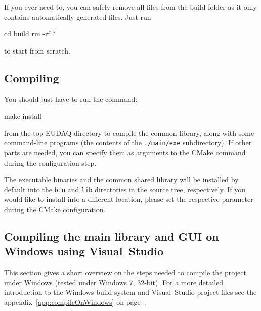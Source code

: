 If you ever need to, you can safely remove all files from the build folder
as it only contains automatically generated files. Just run
\begin{listing}[mybash]
cd build
rm -rf *
\end{listing}
to start from scratch.


\subsection{Compiling}
You should just have to run the command:
\begin{listing}[mybash]
make install
\end{listing}

from the top EUDAQ directory to compile the common library,
along with some command-line programs (the contents of the \texttt{./main/exe} subdirectory).
If other parts are needed, you can specify them as arguments to the
CMake command during the configuration step.

The executable binaries and the common shared library will be installed by default into the
\texttt{bin} and \texttt{lib} directories in the source tree,
respectively. If you would like to install into a different location,
please set the respective parameter during the CMake configuration.

\subsection{Compiling the main library and GUI on Windows using Visual~Studio}

This section gives a short overview on the steps needed to compile the
project under Windows (tested under Windows 7, 32-bit). For a more
detailed introduction to the Windows build system and Visual~Studio
project files see the appendix~\ref{app:compileOnWindows} on
page~\pageref{app:compileOnWindows}.


